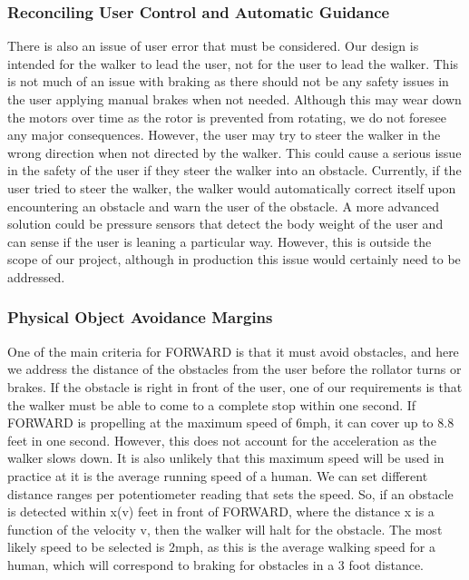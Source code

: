 \subsubsection{Reconciling User Control and Automatic Guidance}
\noindent There is also an issue of user error that must be considered. Our design is intended for the walker to lead the user, not for the user to lead the walker. This is not much of an issue with braking as there should not be any safety issues in the user applying manual brakes when not needed. Although this may wear down the motors over time as the rotor is prevented from rotating, we do not foresee any major consequences. However, the user may try to steer the walker in the wrong direction when not directed by the walker. This could cause a serious issue in the safety of the user if they steer the walker into an obstacle. Currently, if the user tried to steer the walker, the walker would automatically correct itself upon encountering an obstacle and warn the user of the obstacle. A more advanced solution could be pressure sensors that detect the body weight of the user and can sense if the user is leaning a particular way. However, this is outside the scope of our project, although in production this issue would certainly need to be addressed.\\

\subsubsection{Physical Object Avoidance Margins}
\noindent One of the main criteria for FORWARD is that it must avoid obstacles, and here we address the distance of the obstacles from the user before the rollator turns or brakes. If the obstacle is right in front of the user, one of our requirements is that the walker must be able to come to a complete stop within one second. If FORWARD is propelling at the maximum speed of 6mph, it can cover up to 8.8 feet in one second. However, this does not account for the acceleration as the walker slows down. It is also unlikely that this maximum speed will be used in practice at it is the average running speed of a human. We can set different distance ranges per potentiometer reading that sets the speed. So, if an obstacle is detected within x(v) feet in front of FORWARD, where the distance x is a function of the velocity v, then the walker will halt for the obstacle. The most likely speed to be selected is 2mph, as this is the average walking speed for a human, which will correspond to braking for obstacles in a 3 foot distance.\\

